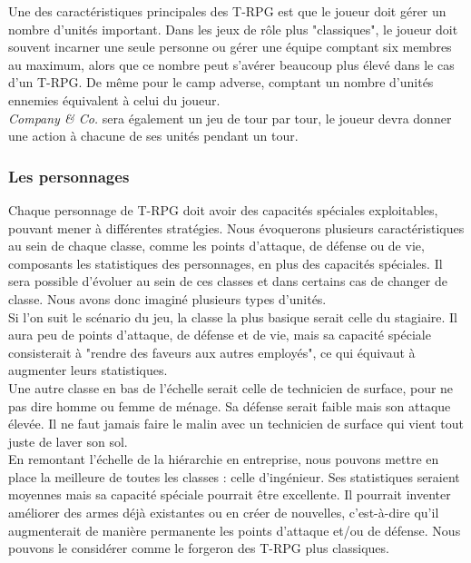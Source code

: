 \documentclass{article}
\begin{document}
Une des caractéristiques principales des T-RPG est que le joueur doit gérer un nombre d'unités important. Dans les jeux de rôle plus "classiques", le joueur doit souvent incarner une seule personne ou gérer une équipe comptant six membres au maximum, alors que ce nombre peut s'avérer beaucoup plus élevé dans le cas d'un T-RPG. De même pour le camp adverse, comptant un nombre d'unités ennemies équivalent à celui du joueur.\\

\textit{Company \& Co.} sera également un jeu de tour par tour, le joueur devra donner une action à chacune de ses unités pendant un tour.

\subsubsection{Les personnages}
Chaque personnage de T-RPG doit avoir des capacités spéciales exploitables, pouvant mener à différentes stratégies. Nous évoquerons plusieurs caractéristiques au sein de chaque classe, comme les points d'attaque, de défense ou de vie, composants les statistiques des personnages, en plus des capacités spéciales. Il sera possible d'évoluer au sein de ces classes et dans certains cas de changer de classe. Nous avons donc imaginé plusieurs types d'unités.\\

Si l'on suit le scénario du jeu, la classe la plus basique serait celle du stagiaire. Il aura peu de points d'attaque, de défense et de vie, mais sa capacité spéciale consisterait à "rendre des faveurs aux autres employés", ce qui équivaut à augmenter leurs statistiques.\\

Une autre classe en bas de l'échelle serait celle de technicien de surface, pour ne pas dire homme ou femme de ménage. Sa défense serait faible mais son attaque élevée. Il ne faut jamais faire le malin avec un technicien de surface qui vient tout juste de laver son sol.\\

En remontant l'échelle de la hiérarchie en entreprise, nous pouvons mettre en place la meilleure de toutes les classes : celle d'ingénieur. Ses statistiques seraient moyennes mais sa capacité spéciale pourrait être excellente. Il pourrait inventer améliorer des armes déjà existantes ou en créer de nouvelles, c'est-à-dire qu'il augmenterait de manière permanente les points d'attaque et/ou de défense. Nous pouvons le considérer comme le forgeron des T-RPG plus classiques.\\ 
\end{document}

